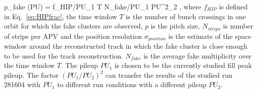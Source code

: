 {
   p_{fake} (PU) = f_{HIP}/PU_{1} \times T  \times N_{fake}/PU_{1} \times PU^2_{2} \times  {}  ,
}
where $f_{HIP}$ is defined in Eq.~\ref{eq:HIPfrac}, the time window $T$ is the number of bunch crossings in one orbit for which the fake clusters are observed, $p$ is the pitch size, $N_{strips}$ is number of strips per APV and the position resolution $\sigma_{position}$ is the estimate of the space window around the reconstructed track in which the fake cluster is close enough to be used for the track reconstruction. $N_{fake}$ is the average fake multiplicity over the time window $T$. The pileup $PU_{1}$ is chosen to be the currently studied fill peak pileup. The factor $(PU_{1}/PU_{2})^2$ can transfer the results of the studied run 281604 with $PU_{1}$ to different run conditions with a different pileup $PU_{2}$.  


\begin{table}
\begin{center}
\caption[Table caption text]{The average cluster charge, multiplicity and width for the four categories defined in Table~\ref{tab:eventCategories} for the run 281604. These quantities are computed from both on-track and off-track clusters.}
\label{tab:clusterCategories}
\end{center}
\end{table}

